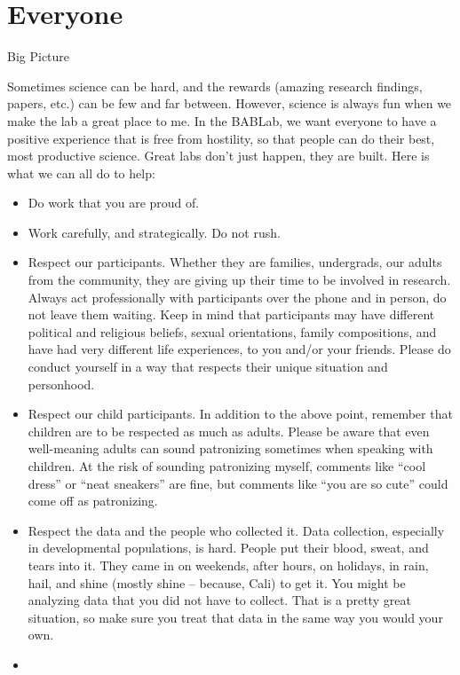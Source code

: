 \documentclass[]{book}
\providecommand{\tightlist}{%
  \setlength{\itemsep}{0pt}\setlength{\parskip}{0pt}}
\begin{document}
\hypertarget{everyone}{%
\section{Everyone}\label{everyone}}

Big Picture

Sometimes science can be hard, and the rewards (amazing research findings, papers, etc.) can be few and far between. However, science is always fun when we make the lab a great place to me. In the BABLab, we want everyone to have a positive experience that is free from hostility, so that people can do their best, most productive science. Great labs don't just happen, they are built. Here is what we can all do to help:

\begin{itemize}
\tightlist
\item
  Do work that you are proud of.
\item
  Work carefully, and strategically. Do not rush.
\item
  Respect our participants. Whether they are families, undergrads, our adults from the community, they are giving up their time to be involved in research. Always act professionally with participants over the phone and in person, do not leave them waiting. Keep in mind that participants may have different political and religious beliefs, sexual orientations, family compositions, and have had very different life experiences, to you and/or your friends. Please do conduct yourself in a way that respects their unique situation and personhood.
\item
  Respect our child participants. In addition to the above point, remember that children are to be respected as much as adults. Please be aware that even well-meaning adults can sound patronizing sometimes when speaking with children. At the risk of sounding patronizing myself, comments like ``cool dress'' or ``neat sneakers'' are fine, but comments like ``you are so cute'' could come off as patronizing.
\item
  Respect the data and the people who collected it. Data collection, especially in developmental populations, is hard. People put their blood, sweat, and tears into it. They came in on weekends, after hours, on holidays, in rain, hail, and shine (mostly shine -- because, Cali) to get it. You might be analyzing data that you did not have to collect. That is a pretty great situation, so make sure you treat that data in the same way you would your own.
\item

\end{itemize}
\end{document}
